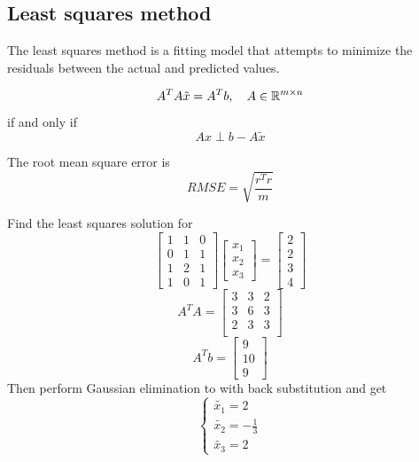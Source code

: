 \documentclass[11pt]{article}
\begin{document}
\subsection{Least squares method}
The least squares method is a fitting model that attempts to minimize the residuals between the actual and predicted values.
\begin{theorem}
    \[
        A^T A \tilde{x} = A^Tb, \quad A \in \mathbb{R}^{m \times n}
    \]
    if and only if
    \[
        Ax \perp b-A\tilde{x}
    \]
\end{theorem}
\begin{definition}
    The root mean square error is
    \[
        RMSE = \sqrt{\frac{r^Tr}{m}}
    \]
\end{definition}
\begin{example}
    Find the least squares solution for
    \[
        \begin{bmatrix}
            1 & 1 & 0\\
            0 & 1 & 1\\
            1 & 2 & 1\\
            1 & 0 & 1
        \end{bmatrix}
        \begin{bmatrix}
            x_1\\
            x_2\\
            x_3
        \end{bmatrix} = 
        \begin{bmatrix}
            2\\
            2\\
            3\\
            4
        \end{bmatrix}
    \]
    \[
        A^TA = \begin{bmatrix}
            3 & 3 & 2\\
            3 & 6 & 3\\
            2&3&3\\
        \end{bmatrix}
    \]
    \[
        A^Tb = \begin{bmatrix}
            9\\10\\9
        \end{bmatrix}
    \]
    Then perform Gaussian elimination to with back substitution and get
    \[
        \begin{cases}
            \tilde{x_1} = 2\\
            \tilde{x_2} = -\frac{1}{3}\\
            \tilde{x_3} = 2
        \end{cases}
    \]
    \end{example}
\end{document}
